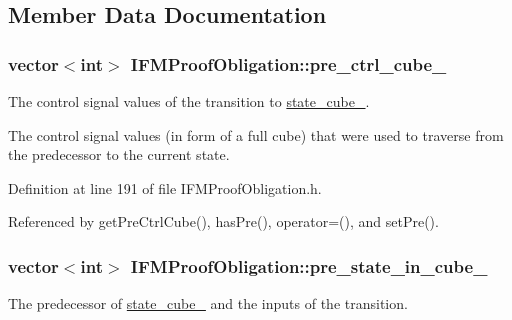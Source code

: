 \subsection{Member Data Documentation}
\hypertarget{classIFMProofObligation_ac29130636a6423e42daf1616754c6c29}{
\subsubsection[{pre\-\_\-ctrl\-\_\-cube\-\_\-}]{\setlength{\rightskip}{0pt plus 5cm}vector$<$int$>$ I\-F\-M\-Proof\-Obligation\-::pre\-\_\-ctrl\-\_\-cube\-\_\-\hspace{0.3cm}{\ttfamily [protected]}}}\label{classIFMProofObligation_ac29130636a6423e42daf1616754c6c29}


The control signal values of the transition to \hyperlink{classIFMProofObligation_a688b714ebad4010c14e11355a73faf3c}{state\-\_\-cube\-\_\-}. 

The control signal values (in form of a full cube) that were used to traverse from the predecessor to the current state. 

Definition at line 191 of file I\-F\-M\-Proof\-Obligation.\-h.



Referenced by get\-Pre\-Ctrl\-Cube(), has\-Pre(), operator=(), and set\-Pre().

\hypertarget{classIFMProofObligation_a949c4d45bd6986a2349edc8f39f38e3f}{
\subsubsection[{pre\-\_\-state\-\_\-in\-\_\-cube\-\_\-}]{\setlength{\rightskip}{0pt plus 5cm}vector$<$int$>$ I\-F\-M\-Proof\-Obligation\-::pre\-\_\-state\-\_\-in\-\_\-cube\-\_\-\hspace{0.3cm}{\ttfamily [protected]}}}\label{classIFMProofObligation_a949c4d45bd6986a2349edc8f39f38e3f}


The predecessor of \hyperlink{classIFMProofObligation_a688b714ebad4010c14e11355a73faf3c}{state\-\_\-cube\-\_\-} and the inputs of the transition. 

